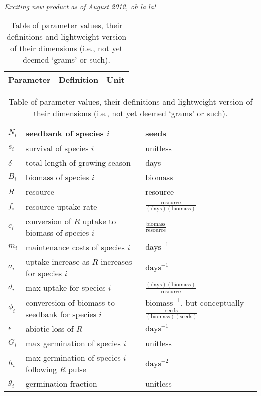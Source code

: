 \documentclass[11pt,a4paper,oneside]{article}
\begin{document}
\newpage 
{}\\
\noindent \emph{Exciting new product as of August 2012, oh la la!}
\\
\begin{center}
\begin{table}[h!]
\caption{Table of parameter values, their definitions and lightweight version of their dimensions (i.e., not yet deemed `grams' or such).}
\begin{tabular}{ | p{3.0cm} | p{6.0cm} | p{4.0cm} |}
\hline 
Parameter & Definition & Unit \\ \hline 
\end{tabular}
\begin{tabular}{ | p{3.0cm} | p{6.0cm} | p{4.0cm} |}
\(N_{i}\) & seedbank of species \(i\) & seeds \\ \hline
\(s_{i}\) & survival of species \(i\) & unitless \\ \hline
\(\delta\) & total length of growing season & days\\ \hline
\(B_{i}\) & biomass of species \(i\) & biomass \\ \hline
\(R\) & resource & resource\\ \hline
\(f_{i}\) & resource uptake rate &  \(\frac{\text{resource}}{(\text{days})(\text{biomass})}\)\\ \hline
\(c_{i}\) & conversion of \(R\) uptake to biomass of species \(i\) &  \(\frac{\text{biomass}}{\text{resource}}\) \\ \hline
\(m_{i}\) & maintenance costs of species \(i\) & \(\text{days}^{-1}\) \\ \hline
\(a_{i}\) & uptake increase as \(R\) increases for species \(i\) & \(\text{days}^{-1}\) \\ \hline
\(d_{i}\) & max uptake for species \(i\) & \(\frac{(\text{days})(\text{biomass})}{\text{resource}}\) \\ \hline
\(\phi_{i}\) & converesion of biomass to seedbank for species \(i\) & \(\text{biomass}^{-1}\), but conceptually \(\frac{\text{seeds}}{(\text{biomass})(\text{seeds})}\) \\ \hline
\(\epsilon\) & abiotic loss of \(R\) &  \(\text{days}^{-1}\) \\ \hline
\(G_{i}\) & max germination of species \(i\) & unitless \\ \hline
\(h_{i}\) & max germination of species \(i\) following \(R\) pulse & \(\text{days}^{-2}\) \\ \hline
\(g_{i}\) & germination fraction & unitless \\ \hline

\end{tabular}
\end{table}
\end{center}
\end{document}
